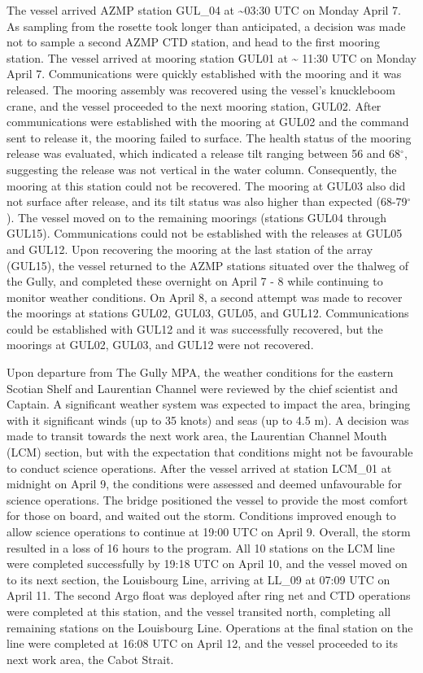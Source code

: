 \documentclass[12pt]{article}\usepackage[]{graphicx}\usepackage[]{color}
\begin{document}
The vessel arrived AZMP station GUL\_04 at \textasciitilde03:30 UTC on Monday April 7. As sampling from the rosette took longer than anticipated, a decision was made not to sample a second AZMP CTD station, and head to the first mooring station. The vessel arrived at mooring station GUL01 at \textasciitilde{} 11:30 UTC on Monday April 7. Communications were quickly established with the mooring and it was released. The mooring assembly was recovered using the vessel's knuckleboom crane, and the vessel proceeded to the next mooring station, GUL02. After communications were established with the mooring at GUL02 and the command sent to release it, the mooring failed to surface. The health status of the mooring release was evaluated, which indicated a release tilt ranging between 56 and 68\(^\circ\), suggesting the release was not vertical in the water column. Consequently, the mooring at this station could not be recovered. The mooring at GUL03 also did not surface after release, and its tilt status was also higher than expected (68-79\(^\circ\)). The vessel moved on to the remaining moorings (stations GUL04 through GUL15). Communications could not be established with the releases at GUL05 and GUL12. Upon recovering the mooring at the last station of the array (GUL15), the vessel returned to the AZMP stations situated over the thalweg of the Gully, and completed these overnight on April 7 - 8 while continuing to monitor weather conditions. On April 8, a second attempt was made to recover the moorings at stations GUL02, GUL03, GUL05, and GUL12. Communications could be established with GUL12 and it was successfully recovered, but the moorings at GUL02, GUL03, and GUL12 were not recovered.

Upon departure from The Gully MPA, the weather conditions for the eastern Scotian Shelf and Laurentian Channel were reviewed by the chief scientist and Captain. A significant weather system was expected to impact the area, bringing with it significant winds (up to 35 knots) and seas (up to 4.5 m). A decision was made to transit towards the next work area, the Laurentian Channel Mouth (LCM) section, but with the expectation that conditions might not be favourable to conduct science operations. After the vessel arrived at station LCM\_01 at midnight on April 9, the conditions were assessed and deemed unfavourable for science operations. The bridge positioned the vessel to provide the most comfort for those on board, and waited out the storm. Conditions improved enough to allow science operations to continue at 19:00 UTC on April 9. Overall, the storm resulted in a loss of 16 hours to the program. All 10 stations on the LCM line were completed successfully by 19:18 UTC on April 10, and the vessel moved on to its next section, the Louisbourg Line, arriving at LL\_09 at 07:09 UTC on April 11. The second Argo float was deployed after ring net and CTD operations were completed at this station, and the vessel transited north, completing all remaining stations on the Louisbourg Line. Operations at the final station on the line were completed at 16:08 UTC on April 12, and the vessel proceeded to its next work area, the Cabot Strait.
\end{document}
